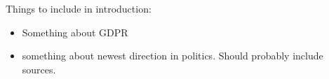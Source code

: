 
Things to include in introduction:
\begin{itemize}
    \item Something about GDPR
    \item something about newest direction in politics. Should probably include sources. 
\end{itemize}

\cite{franceschi_unsupervised_2019}

\cite{TS2Vec}



